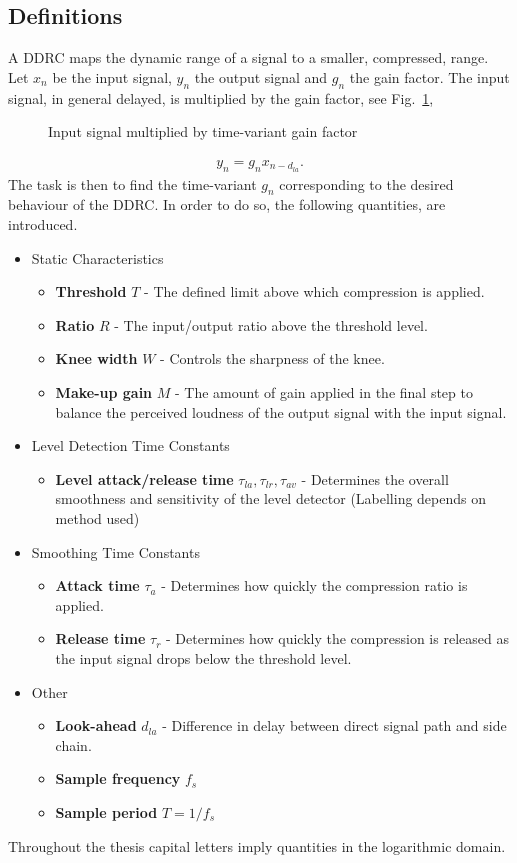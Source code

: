 \documentclass[../main2.tex]{subfiles}
\providecommand{\rootdir}{..}
\begin{document}
\subsection{Definitions}\label{theory_definitions}
A DDRC maps the dynamic range of a signal to a smaller, compressed, range. Let $x_n$ be the input signal, $y_n$ the output signal and $g_n$ the gain factor. The input signal, in general delayed, is multiplied by the gain factor, see Fig.~\ref{fig:block_gain},
\begin{figure}
\centerline{}
\caption{Input signal multiplied by time-variant gain factor}
\label{fig:block_gain}
\end{figure}
\begin{align}
y_n = g_nx_{n-d_{la}}.
\label{eq:gainfactor}
\end{align}
The task is then to find the time-variant $g_n$ corresponding to the desired behaviour of the DDRC. In order to do so, the following quantities, are introduced.%
\begin{itemize}
\item{Static Characteristics}
	\begin{itemize}
	\item \textbf{Threshold} $T$ - The defined limit above which compression is applied.
	\item \textbf{Ratio} $R$ - The input/output ratio above the threshold level.
	\item \textbf{Knee width}  $W$ - Controls the sharpness of the knee.
	\item \textbf{Make-up gain}  $M$ - The amount of gain applied in the final step to balance the perceived loudness of the output signal with the input signal.
\end{itemize}
\item{Level Detection Time Constants}
	\begin{itemize}
	\item \textbf{Level attack/release time} $\tau_{la}, \tau_{lr}, \tau_{av}$ - Determines the overall smoothness and sensitivity of the level detector (Labelling depends on method used)
	\end{itemize}
\item{Smoothing Time Constants}
	\begin{itemize}
	\item \textbf{Attack time} $\tau_{a}$ - Determines how quickly the compression ratio is applied.
	\item \textbf{Release time} $\tau_{r}$ - Determines how quickly the compression is released as the input signal drops below the threshold level.
	\end{itemize}
\item{Other}
	\begin{itemize}
	\item \textbf{Look-ahead} $d_{la}$ - Difference in delay between direct signal path and side chain. 
	\item \textbf{Sample frequency} $f_s$
	\item \textbf{Sample period} $T = 1/f_s$
	\end{itemize}
\end{itemize}
Throughout the thesis capital letters imply quantities in the logarithmic domain. 
\end{document}
